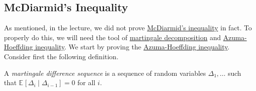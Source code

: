 \subsection{McDiarmid's Inequality}
As mentioned, in the lecture, we did not prove \hyperref[thm:McDiarmid-inequality]{McDiarmid's inequality} in fact. To properly do this, we will need the tool of \hyperref[def:martingale-decomposition]{martingale decomposition} and \hyperref[thm:Azuma-Hoeffding-inequality]{Azuma-Hoeffding inequality}. We start by proving the \hyperref[thm:Azuma-Hoeffding-inequality]{Azuma-Hoeffding inequality}. Consider first the following definition.

\begin{definition}\label{def:martingale-difference-sequence}
	A \emph{martingale difference sequence} is a sequence of random variables \(\Delta _1, \dots \) such that \(\mathbb{E}_{}\left[\Delta _i \mid \Delta _{i-1} \right] = 0\) for all \(i\).
\end{definition}

